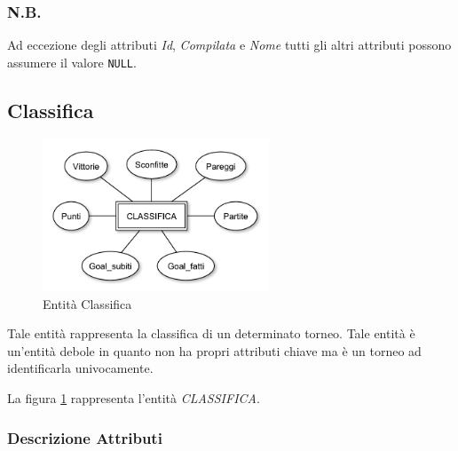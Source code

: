 		\subsubsection*{N.B.}
		Ad eccezione degli attributi \emph{Id}, \emph{Compilata} e \emph{Nome} tutti gli altri attributi possono assumere il valore \texttt{NULL}.
	
	\subsection{Classifica}
	
		\begin{figure}[h]
			\centering
			\includegraphics[width=0.6\textwidth]
			{immagini/10-classifica}
			
			\caption{Entità Classifica}
			\label{entita-classifica}
		\end{figure}
		
		Tale entità rappresenta la classifica di un determinato torneo. Tale entità è un'entità debole in quanto non ha propri attributi chiave ma è un torneo ad identificarla univocamente.
		
		La figura \ref{entita-classifica} rappresenta l'entità \emph{CLASSIFICA}.
		
		\subsubsection*{Descrizione Attributi}
		
